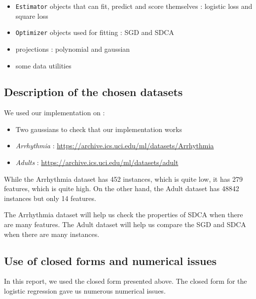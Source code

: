 \documentclass{article}
\begin{document}
\begin{itemize}
	\item \texttt{Estimator} objects that can fit, predict and score themselves : logistic loss and square loss
	\item \texttt{Optimizer} objects used for fitting : SGD and SDCA
	\item projections : polynomial and gaussian
	\item some data utilities
\end{itemize}

\subsection{Description of the chosen datasets}

We used our implementation on :

\begin{itemize}
	\item Two gaussians to check that our implementation works
	\item \textit{Arrhythmia} : \url{https://archive.ics.uci.edu/ml/datasets/Arrhythmia}
	\item \textit{Adults} : \url{https://archive.ics.uci.edu/ml/datasets/adult}
\end{itemize}

While the Arrhythmia dataset has 452 instances, which is quite low, it has 279 features, which is quite high.
On the other hand, the Adult dataset has 48842 instances but only 14 features.

The Arrhythmia dataset will help us check the properties of SDCA when there are many features.
The Adult dataset will help us compare the SGD and SDCA when there are many instances.

\subsection{Use of closed forms and numerical issues}

In this report, we used the closed form presented above.
The closed form for the logistic regression gave us numerous numerical issues.


\end{document}

